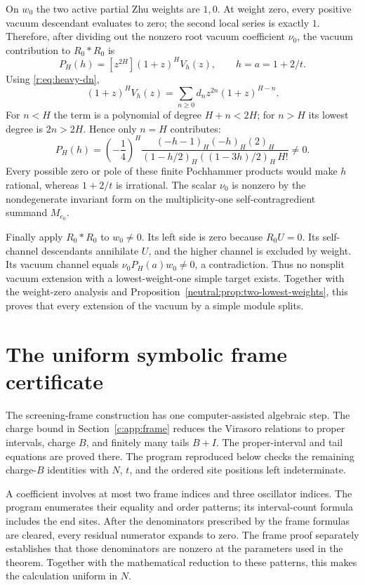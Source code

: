 \documentclass[11pt,a4paper]{article}
\numberwithin{equation}{section}
\theoremstyle{definition}\newtheorem{definition}[theorem]{Definition}
\theoremstyle{remark}\newtheorem{remark}[theorem]{Remark}
\begin{document}
On $w_0$ the two active partial Zhu weights are $1,0$.  At weight zero,
every positive vacuum descendant evaluates to zero; the second local
series is exactly $1$.  Therefore, after dividing out the nonzero
root vacuum coefficient $\nu_0$, the vacuum contribution to
$R_0*R_0$ is
\[
 P_H(h)=[z^{2H}](1+z)^HV_h(z),\qquad h=a=1+2/t.
\]
Using \eqref{r:eq:heavy-dn},
\[
 (1+z)^HV_h(z)=\sum_{n\geq0}d_nz^{2n}(1+z)^{H-n}.
\]
For $n<H$ the term is a polynomial of degree $H+n<2H$; for $n>H$
its lowest degree is $2n>2H$.  Hence only $n=H$ contributes:
\begin{equation}
 \boxed{\quad
 P_H(h)=\left(-\frac14\right)^H
 \frac{(-h-1)_H(-h)_H(2)_H}
 {(1-h/2)_H((1-3h)/2)_H\,H!}\ne0.
 \quad}
 \label{r:eq:heavy-nonzero}
\end{equation}
Every possible zero or pole of these finite Pochhammer products would
make $h$ rational, whereas $1+2/t$ is irrational.  The scalar $\nu_0$
is nonzero by the nondegenerate invariant form on the multiplicity-one
self-contragredient summand \(M_{e_0}\).

Finally apply $R_0*R_0$ to $w_0\ne0$.  Its left side is zero because
$R_0U=0$.  Its self-channel descendants annihilate $U$, and the higher
channel is excluded by weight.  Its vacuum channel equals
$\nu_0P_H(a)w_0\ne0$, a contradiction.  Thus no nonsplit vacuum
extension with a lowest-weight-one simple target exists.  Together with the weight-zero analysis and
Proposition~\ref{neutral:prop:two-lowest-weights}, this proves that
every extension of the vacuum by a simple module splits.

\section{The uniform symbolic frame certificate}
\label{app:certificate}

The screening-frame construction has one computer-assisted algebraic
step. The charge bound in Section~\ref{c:app:frame} reduces the
Virasoro relations to proper intervals, charge $B$, and finitely many
tails $B+I$. The proper-interval and tail equations are proved there.
The program reproduced below checks the remaining charge-$B$
identities with $N$, $t$, and the ordered site positions left
indeterminate.

A coefficient involves at most two frame indices and three oscillator
indices. The program enumerates their equality and order patterns;
its interval-count formula includes the end sites. After the
denominators prescribed by the frame formulas are cleared, every
residual numerator expands to zero. The frame proof separately
establishes that those denominators are nonzero at the parameters
used in the theorem. Together with the mathematical reduction to
these patterns, this makes the calculation uniform in $N$.
\end{document}
